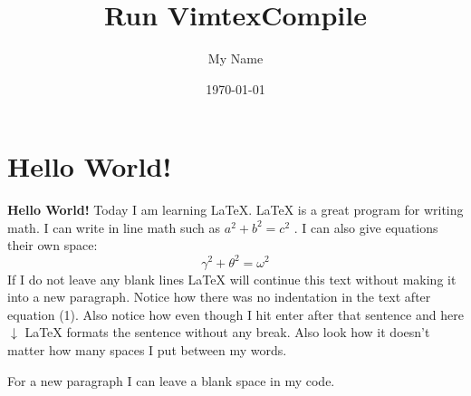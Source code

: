 \documentclass{article} %
\title{Run VimtexCompile} %
\author{My Name} %
\date{\today} %
\begin{document}
    \maketitle %
    
    \section{Hello World!} %
    
    \textbf{Hello World!} Today I am learning \LaTeX. %
     \LaTeX{} is a great program for writing math. I can write in line math such as $a^2+b^2=c^2$ %
     . I can also give equations their own space: 
    \begin{equation} %
    \gamma^2+\theta^2=\omega^2
    \end{equation}
    If I do not leave any blank lines \LaTeX{} will continue  this text without making it into a new paragraph.  Notice how there was no indentation in the text after equation (1).  
    Also notice how even though I hit enter after that sentence and here $\downarrow$
     \LaTeX{} formats the sentence without any break.  Also   look  how      it   doesn't     matter          how    many  spaces     I put     between       my    words.
    
    For a new paragraph I can leave a blank space in my code. 
\end{document}
